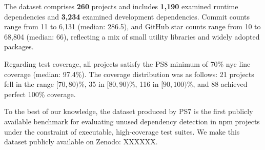 The dataset comprises \textbf{260} projects and includes \textbf{1,190} examined runtime dependencies and \textbf{3,234} examined development dependencies.
Commit counts range from 11 to 6,131 (median: 286.5), and GitHub star counts
range from 10 to 68,804 (median: 66), reflecting a mix of small utility
libraries and widely adopted packages.

Regarding test coverage, all projects satisfy the PS8 minimum of 70\%
nyc line coverage (median: 97.4\%).
The coverage distribution was as follows: 21 projects fell in the range $[70, 80)$\%, 35 in $[80, 90)$\%, 116 in $[90, 100)$\%, and 88 achieved perfect 100\% coverage.

To the best of our knowledge, the dataset produced by PS7 is the first publicly available benchmark for evaluating unused dependency detection in npm projects under the constraint of executable, high-coverage test suites. We make this dataset publicly available on Zenodo: XXXXXX.